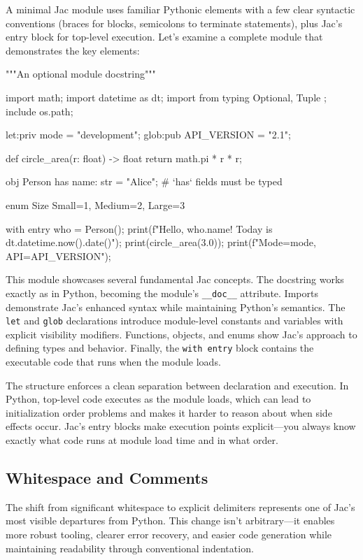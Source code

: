 A minimal Jac module uses familiar Pythonic elements with a few clear syntactic conventions (braces for blocks, semicolons to terminate statements), plus Jac's entry block for top-level execution. Let's examine a complete module that demonstrates the key elements:

\begin{jacblock}
"""An optional module docstring"""

import math;
import datetime as dt;
import from typing { Optional, Tuple };
include os.path;

let:priv mode = "development";
glob:pub API_VERSION = "2.1";

def circle_area(r: float) -> float {
    return math.pi * r * r;
}

obj Person {
    has name: str = "Alice";   # `has` fields must be typed
}

enum Size { Small=1, Medium=2, Large=3 }

with entry {
    who = Person();
    print(f"Hello, {who.name}! Today is {dt.datetime.now().date()}");
    print(circle_area(3.0));
    print(f"Mode={mode}, API={API_VERSION}");
}
\end{jacblock}

This module showcases several fundamental Jac concepts. The docstring works exactly as in Python, becoming the module's \texttt{\_\_doc\_\_} attribute. Imports demonstrate Jac's enhanced syntax while maintaining Python's semantics. The \texttt{let} and \texttt{glob} declarations introduce module-level constants and variables with explicit visibility modifiers. Functions, objects, and enums show Jac's approach to defining types and behavior. Finally, the \texttt{with entry} block contains the executable code that runs when the module loads.

The structure enforces a clean separation between declaration and execution. In Python, top-level code executes as the module loads, which can lead to initialization order problems and makes it harder to reason about when side effects occur. Jac's entry blocks make execution points explicit—you always know exactly what code runs at module load time and in what order.

\subsection{Whitespace and Comments}

The shift from significant whitespace to explicit delimiters represents one of Jac's most visible departures from Python. This change isn't arbitrary—it enables more robust tooling, clearer error recovery, and easier code generation while maintaining readability through conventional indentation.

